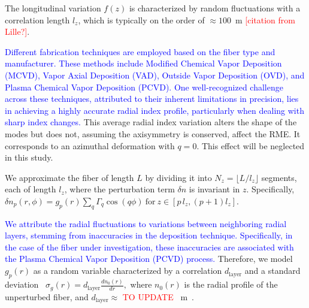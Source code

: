 \documentclass[aps,prl,twocolumn, amsmath,amssymb,superscriptaddress]{revtex4-2}
\newcommand{\red}[1]{\textcolor{red}{#1}}
\newcommand{\blue}[1]{\textcolor{blue}{#1}}
\begin{document}


The longitudinal variation $f(z)$ is characterized by random fluctuations with 
a correlation length $l_z$, 
which is typically on the order of $\approx 100$~\textmu m \red{[citation from Lille?]}.

\blue{
Different fabrication techniques are employed 
based on the fiber type and manufacturer. 
These methods include 
Modified Chemical Vapor Deposition (MCVD), 
Vapor Axial Deposition (VAD), Outside Vapor Deposition (OVD), 
and Plasma Chemical Vapor Deposition (PCVD). 
One well-recognized challenge across these techniques, 
attributed to their inherent limitations in precision, 
lies in achieving a highly accurate radial index profile, 
particularly when dealing with sharp index changes.
}
This average radial index variation alters the shape of the modes but does not, assuming the axisymmetry is conserved, affect the RME. 
It corresponds to an azimuthal deformation with $q=0$.
This effect will be neglected in this study.

We approximate the fiber of length $L$ by dividing it into $N_z = \lfloor L/l_z \rfloor$ segments, each of length $l_z$,
where the perturbation term $\delta n$ is invariant in $z$. 
Specifically,
$
\delta n_p(r,\phi) = g_p(r)\sum_q \Gamma_q\cos(q\phi)\ \text{for}\ z \in \left[ p\,l_z, (p+1)l_z \right].
$

\blue{
We attribute the radial fluctuations to variations between neighboring radial layers, 
stemming from inaccuracies in the deposition technique. 
Specifically, in the case of the fiber under investigation, 
these inaccuracies are associated with the Plasma Chemical Vapor Deposition (PCVD) process.
}
Therefore, we model $g_p(r)$ as a random variable characterized by a correlation $d_\text{layer}$ and a standard deviation~\cite{Lydtin1986pcvd} 
$
\sigma_g(r) = d_\text{layer}\frac{dn_0(r)}{dr},
$
where $n_0(r)$ is the radial profile of the unperturbed fiber, and $d_\text{layer} \approx$
\red {TO UPDATE}
~\textmu m~\cite{geittner1989manufacturing}.
\end{document}
